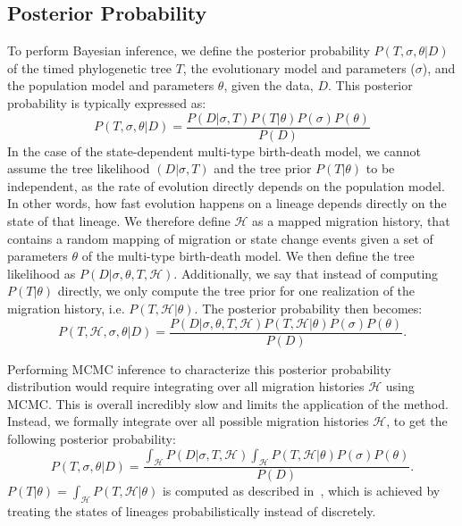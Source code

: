 \documentclass[12pt]{elife_based}
\begin{document}
\subsection*{Posterior Probability}

To perform Bayesian inference, we define the posterior probability $P(T,\sigma,\theta|D)$ of the timed phylogenetic tree $T$, the evolutionary model and parameters ($\sigma$), and the population model and parameters $\theta$, given the data, $D$.
This posterior probability is typically expressed as:
 \begin{equation}
     P(T,\sigma,\theta|D)=\frac{P(D|\sigma,T)P(T|\theta)P(\sigma)P(\theta)}{P(D)}
 \end{equation}
 In the case of the state-dependent multi-type birth-death model, we cannot assume the tree likelihood $(D|\sigma,T)$ and the tree prior $P(T|\theta)$ to be independent, as the rate of evolution directly depends on the population model.
In other words, how fast evolution happens on a lineage depends directly on the state of that lineage.
 We therefore define $\mathcal{H}$ as a mapped migration history, that contains a random mapping of migration or state change events given a set of parameters $\theta$ of the multi-type birth-death model.
 We then define the tree likelihood as $P(D|\sigma,\theta,T,\mathcal{H})$.
 Additionally, we say that instead of computing $P(T|\theta)$ directly, we only compute the tree prior for one realization of the migration history, i.e.  $P(T,\mathcal{H}|\theta)$.
 The posterior probability then becomes:
  \begin{equation}
     P(T,\mathcal{H},\sigma,\theta|D)=\frac{P(D|\sigma,\theta,T,\mathcal{H})P(T,\mathcal{H}|\theta)P(\sigma)P(\theta)}{P(D)}.
 \end{equation}

Performing MCMC inference to characterize this posterior probability distribution would require integrating over all migration histories $\mathcal{H}$ using MCMC.
This is overall incredibly slow and limits the application of the method.
Instead, we formally integrate over all possible migration histories $\mathcal{H}$, to get the following posterior probability:
\begin{equation}
     P(T,\sigma,\theta|D)=\frac{\int_{\mathcal{H}}P(D|\sigma,T,\mathcal{H})\int_{\mathcal{H}}P(T,\mathcal{H}|\theta)P(\sigma)P(\theta)}{P(D)}.
 \end{equation}
 $P(T|\theta)=\int_{\mathcal{H}} P(T,\mathcal{H}|\theta)$ is computed as described in~\cite{Kuhnert:2016vv}, which is achieved by treating the states of lineages probabilistically instead of discretely.
 
\end{document}
